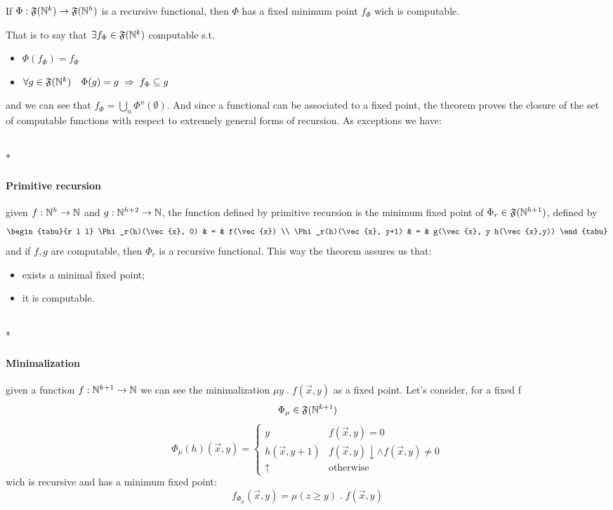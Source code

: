 \begin{theorem}
  If $\Phi : \mathfrak{F}(\mathbb{N}^k) \rightarrow \mathfrak{F}(\mathbb{N}^h)$ is
  a recursive functional, then $\Phi$ has a fixed minimum point
  $f_\Phi$ wich is computable.
\end{theorem}

That is to say that $\exists f_\Phi \in \mathfrak{F}(\mathbb{N}^k)$
computable s.t.
\begin{itemize}
\item $\Phi(f_\Phi) = f_\Phi$
\item
  $\forall g \in \mathfrak{F}(\mathbb{N}^k) \quad \Phi(g) = g \; \Rightarrow
  \; f_\Phi \subseteq g$
\end{itemize}
and we can see that $f_\Phi = \bigcup\limits_n
\Phi^{n}(\emptyset)$. And since a functional can be associated to a
fixed point, the theorem proves the closure of the set of computable
functions with respect to extremely general forms of recursion. As
exceptions we have:

\mbox{}\\*
\paragraph{\textbf{Primitive recursion}}
given $f : \mathbb{N}^h \rightarrow \mathbb{N}$ and
$g : \mathbb{N}^{h+2} \rightarrow \mathbb{N}$, the function defined by primitive
recursion is the minimum fixed point of
$\Phi_r \in \mathfrak{F}(\mathbb{N}^{h+1})$, defined by
\[
  \begin{tabu}{r l l}
    \Phi_r(h)(\vec{x}, 0) & = & f(\vec{x}) \\
    \Phi_r(h)(\vec{x}, y+1) & = & g(\vec{x}, y h(\vec{x},y))
  \end{tabu}
\]
and if $f,g$ are computable, then $\Phi_r$ is a recursive
functional. This way the theorem assures us that:
\begin{itemize}
\item exists a minimal fixed point;
\item it is computable.
\end{itemize}

\mbox{}\\*
\paragraph{\textbf{Minimalization}}
given a function $f: \mathbb{N}^{k+1} \rightarrow \mathbb{N}$ we can see the
minimalization $\mu y \; . \; f(\vec{x}, y)$ as a fixed point. Let's
consider, for a fixed f
\[
  \Phi_\mu \in \mathfrak{F}(\mathbb{N}^{k+1})
\]
\[
  \Phi_\mu(h)(\vec{x}, y) = \begin{cases}
    y & f(\vec{x},y) = 0 \\
    h(\vec{x}, y+1) & f(\vec{x}, y)\downarrow \land f(\vec{x}, y) \neq 0 \\
    \uparrow & \mbox{otherwise}
  \end{cases}
\]
wich is recursive and has a minimum fixed point:
\[
  f_{\Phi_\mu}(\vec{x}, y) = \mu (z \geq y) \; . \; f(\vec{x}, y)
\]

